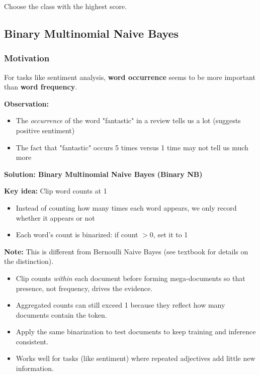 \documentclass[11pt,a4paper]{article}
\theoremstyle{definition}
\theoremstyle{plain}
\theoremstyle{remark}
\begin{document}
Choose the class with the highest score.

\subsection{Binary Multinomial Naive Bayes}

\subsubsection{Motivation}

For tasks like sentiment analysis, \textbf{word occurrence} seems to be more important than \textbf{word frequency}.

\textbf{Observation:}
\begin{itemize}
    \item The \textit{occurrence} of the word "fantastic" in a review tells us a lot (suggests positive sentiment)
    \item The fact that "fantastic" occurs 5 times versus 1 time may not tell us much more
\end{itemize}

\textbf{Solution: Binary Multinomial Naive Bayes (Binary NB)}

\textbf{Key idea:} Clip word counts at 1
\begin{itemize}
    \item Instead of counting how many times each word appears, we only record whether it appears or not
    \item Each word's count is binarized: if count $> 0$, set it to 1
\end{itemize}

\textbf{Note:} This is different from Bernoulli Naive Bayes (see textbook for details on the distinction).

\begin{tcolorbox}[colback=green!5!white,colframe=green!65!black,title=\textbf{Binary Multinomial NB Essentials}]
\begin{itemize}
    \item Clip counts \textit{within} each document before forming mega-documents so that presence, not frequency, drives the evidence.
    \item Aggregated counts can still exceed 1 because they reflect how many documents contain the token.
    \item Apply the same binarization to test documents to keep training and inference consistent.
    \item Works well for tasks (like sentiment) where repeated adjectives add little new information.
\end{itemize}
\end{tcolorbox}
\end{document}
